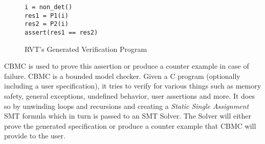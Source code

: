 \begin{figure}[h]
\begin{center}
\begin{minipage}{7 cm}

\begin{lstlisting}
i = non_det()
res1 = P1(i)
res2 = P2(i)
assert(res1 == res2) 
\end{lstlisting}
\end{minipage}
\caption{RVT's Generated Verification Program}
\label{fig:rvtmainprogram}
\end{center}
\end{figure}
CBMC is used to prove this assertion or produce a counter example in case of failure. CBMC is a bounded model checker. Given a C program (optionally including a user specification), it tries to verify for various things such as memory safety, general exceptions, undefined behavior, user assertions and more. It does so by unwinding loops and recursions and creating a \emph{Static Single Assignment} SMT formula which in turn is passed to an SMT Solver. The Solver will either prove the generated specification or produce a counter example that CBMC will provide to the user. 

